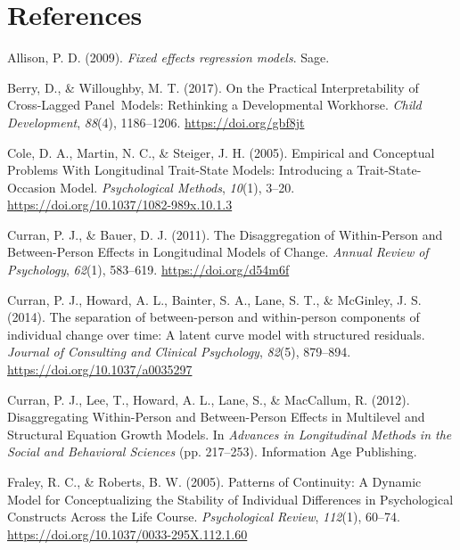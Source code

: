 \documentclass[
  english,
  man,floatsintext]{apa6}
\newlength{\cslhangindent}
\newlength{\cslentryspacingunit} %
\newenvironment{CSLReferences}[2] %
 {%
  \setlength{\parindent}{0pt}
  \ifodd #1
  \let\oldpar\par
  \def\par{\hangindent=\cslhangindent\oldpar}
  \fi
  \setlength{\parskip}{#2\cslentryspacingunit}
 }%
 {}
\begin{document}
\hypertarget{references}{%
\section*{References}\label{references}}

\hypertarget{refs}{}
\begin{CSLReferences}{1}{0}
\leavevmode{}%
Allison, P. D. (2009). \emph{Fixed effects regression models}. {Sage}.

\leavevmode{}%
Berry, D., \& Willoughby, M. T. (2017). On the {Practical Interpretability} of {Cross-Lagged Panel~Models}: {Rethinking} a {Developmental Workhorse}. \emph{Child Development}, \emph{88}(4), 1186--1206. \url{https://doi.org/gbf8jt}

\leavevmode{}%
Cole, D. A., Martin, N. C., \& Steiger, J. H. (2005). Empirical and {Conceptual Problems With Longitudinal Trait-State Models}: {Introducing} a {Trait-State-Occasion Model}. \emph{Psychological Methods}, \emph{10}(1), 3--20. \url{https://doi.org/10.1037/1082-989x.10.1.3}

\leavevmode{}%
Curran, P. J., \& Bauer, D. J. (2011). The {Disaggregation} of {Within-Person} and {Between-Person Effects} in {Longitudinal Models} of {Change}. \emph{Annual Review of Psychology}, \emph{62}(1), 583--619. \url{https://doi.org/d54m6f}

\leavevmode{}%
Curran, P. J., Howard, A. L., Bainter, S. A., Lane, S. T., \& McGinley, J. S. (2014). The separation of between-person and within-person components of individual change over time: {A} latent curve model with structured residuals. \emph{Journal of Consulting and Clinical Psychology}, \emph{82}(5), 879--894. \url{https://doi.org/10.1037/a0035297}

\leavevmode{}%
Curran, P. J., Lee, T., Howard, A. L., Lane, S., \& MacCallum, R. (2012). Disaggregating {Within-Person} and {Between-Person Effects} in {Multilevel} and {Structural Equation Growth Models}. In \emph{Advances in {Longitudinal Methods} in the {Social} and {Behavioral Sciences}} (pp. 217--253). {Information Age Publishing}.

\leavevmode{}%
Fraley, R. C., \& Roberts, B. W. (2005). Patterns of {Continuity}: {A Dynamic Model} for {Conceptualizing} the {Stability} of {Individual Differences} in {Psychological Constructs Across} the {Life Course}. \emph{Psychological Review}, \emph{112}(1), 60--74. \url{https://doi.org/10.1037/0033-295X.112.1.60}


\end{CSLReferences}
\end{document}
